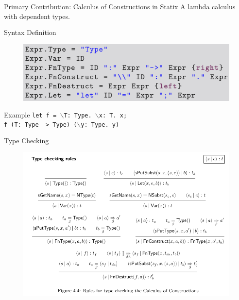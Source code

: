 \documentclass[aspectratio=43]{beamer}
\begin{document}
\begin{frame}[fragile]{Primary Contribution: Calculus of Constructions in Statix}
	A lambda calculus with dependent types.
	
	\begin{block}{Syntax Definition}
		\begin{figure}
			\includegraphics[width=0.7\linewidth]{img/screenshot006}
		\end{figure}
	\end{block}

	\begin{exampleblock}{Example}
		\texttt{let f = $\backslash$T: Type. $\backslash$x: T. x; \\
f (T: Type -> Type) ($\backslash$y: Type. y)
		}
	\end{exampleblock}

\end{frame}

\begin{frame}[fragile]{Type Checking}
	\begin{figure}
		\includegraphics[width=0.9\linewidth]{img/screenshot007}
	\end{figure}
\end{frame}
\end{document}
